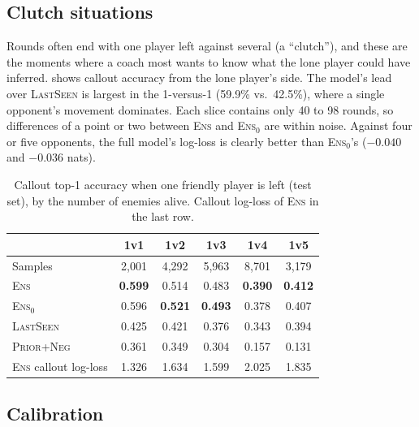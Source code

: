 \documentclass[11pt]{article}
\newcommand{\model}[1]{\textsc{#1}}
\newcommand{\1}{\mathbb{1}}
\begin{document}
\subsection{Clutch situations}
\label{sec:clutch}
Rounds often end with one player left against several (a ``clutch''), and these are the moments where a coach most wants to know what the lone player could have inferred.  shows callout accuracy from the lone player's side. The model's lead over \model{LastSeen} is largest in the 1-versus-1 (59.9\% vs.\ 42.5\%), where a single opponent's movement dominates. Each slice contains only 40 to 98 rounds, so differences of a point or two between \model{Ens} and \model{Ens$_0$} are within noise. Against four or five opponents, the full model's log-loss is clearly better than \model{Ens$_0$}'s ($-0.040$ and $-0.036$ nats).

\begin{table}[t]
\centering
\caption{Callout top-1 accuracy when one friendly player is left (test set), by the number of enemies alive. Callout log-loss of \model{Ens} in the last row.}
\label{tab:clutch}
\small
\begin{tabular}{@{}lccccc@{}}
\toprule
 & 1v1 & 1v2 & 1v3 & 1v4 & 1v5 \\
\midrule
Samples & 2{,}001 & 4{,}292 & 5{,}963 & 8{,}701 & 3{,}179 \\
\model{Ens} & \textbf{0.599} & 0.514 & 0.483 & \textbf{0.390} & \textbf{0.412} \\
\model{Ens$_0$} & 0.596 & \textbf{0.521} & \textbf{0.493} & 0.378 & 0.407 \\
\model{LastSeen} & 0.425 & 0.421 & 0.376 & 0.343 & 0.394 \\
\model{Prior+Neg} & 0.361 & 0.349 & 0.304 & 0.157 & 0.131 \\
\midrule
\model{Ens} callout log-loss & 1.326 & 1.634 & 1.599 & 2.025 & 1.835 \\
\bottomrule
\end{tabular}
\end{table}

\subsection{Calibration}
\label{sec:res-calibration}
\end{document}
